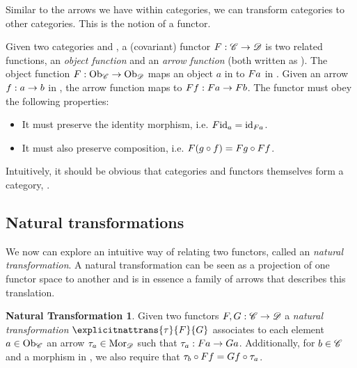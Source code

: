Similar to the arrows we have within categories, we can transform categories to other categories. This is the notion of a functor.
\begin{covfunctordef}
  Given two categories  and , a (covariant) functor $\mathnormal{F}: \mathscr{C} \to \mathscr{D}$ is two related functions, an \emph{object function} and an \emph{arrow function} (both written as ). The object function $\mathnormal{F}: \mathrm{Ob}_{\mathscr{C}} \to \mathrm{Ob}_{\mathscr{D}}$ maps an object $a$ in  to $\mathnormal{F} \mathnormal{a}$ in . Given an arrow $\mathnormal{f}: \mathnormal{a} \to \mathnormal{b}$ in , the arrow function maps  to $\mathnormal{F} \mathnormal{f}: \mathnormal{F} \mathnormal{a} \to \mathnormal{F} \mathnormal{b}$. The functor must obey the following properties: 
  \begin{itemize}
    \item It must preserve the identity morphism, i.e. $\mathnormal{F} \mathnormal{\mathrm{id}_{\mathnormal{a}}} = \mathrm{id}_{\mathnormal{\mathnormal{F} \mathnormal{a}}}$.
    \item It must also preserve composition, i.e. $\mathnormal{F} \mathnormal{\left(\mathnormal{g} \circ \mathnormal{f}\right)} = \mathnormal{F} \mathnormal{\mathnormal{g}} \circ \mathnormal{F} \mathnormal{\mathnormal{f}}$.
  \end{itemize}
\end{covfunctordef}

Intuitively, it should be obvious that categories and functors themselves form a category, .\\

\subsection{Natural transformations}
\theoremstyle{definition}\newtheorem*{nattransdef}{Natural Transformation}
We now can explore an intuitive way of relating two functors, called an \emph{natural transformation}. A natural transformation can be seen as a projection of one functor space to another and is in essence a family of arrows that describes this translation.
\begin{nattransdef}
Given two functors $\mathnormal{F}, \mathnormal{G} : \mathscr{C} \to \mathscr{D}$ a
\emph{natural transformation} $\explicitnattrans{\tau}{F}{G}$ associates to each element $\mathnormal{a} \in \mathrm{Ob}_{\mathscr{C}}$ an arrow $\tau_{a} \in \mathrm{Mor}_{\mathscr{D}}$ such that $\tau_{a}: \mathnormal{F} \mathnormal{a} \to \mathnormal{G} \mathnormal{a}$. Additionally, for $\mathnormal{b} \in \mathscr{C}$ and  a morphism in , we also require that $\tau_{b} \circ \mathnormal{F} \mathnormal{f} = \mathnormal{G} \mathnormal{f} \circ \tau_{a}$.

\end{nattransdef}

